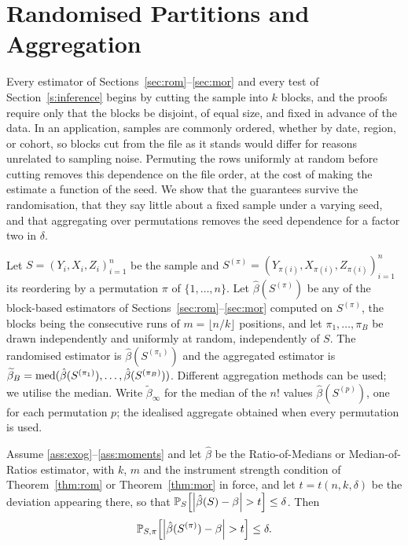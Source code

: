 \section{Randomised Partitions and Aggregation}
\label{sec:aggregation}

Every estimator of Sections~\ref{sec:rom}--\ref{sec:mor} and every test of Section~\ref{s:inference} begins by cutting the sample into $k$ blocks, and the proofs require only that the blocks be disjoint, of equal size, and fixed in advance of the data. In an application, samples are commonly ordered, whether by date, region, or cohort, so blocks cut from the file as it stands would differ for reasons unrelated to sampling noise. Permuting the rows uniformly at random before cutting removes this dependence on the file order, at the cost of making the estimate a function of the seed. We show that the guarantees survive the randomisation, that they say little about a fixed sample under a varying seed, and that aggregating over permutations removes the seed dependence for a factor two in $\delta$.

\begin{definition}
\label{def:randomised}
    Let $S = (Y_i,X_i,Z_i)_{i=1}^{n}$ be the sample and $S^{(\pi)} = (Y_{\pi(i)},X_{\pi(i)},Z_{\pi(i)})_{i=1}^{n}$ its reordering by a permutation $\pi$ of $\{1,\dots,n\}$. Let $\hat{\beta}(S^{(\pi)})$ be any of the block-based estimators of Sections~\ref{sec:rom}--\ref{sec:mor} computed on $S^{(\pi)}$, the blocks being the consecutive runs of $m = \lfloor n/k\rfloor$ positions, and let $\pi_1,\dots,\pi_B$ be drawn independently and uniformly at random, independently of $S$. The randomised estimator is $\hat{\beta}(S^{(\pi_1)})$ and the aggregated estimator is $\widetilde{\beta}_B = \operatorname{med}(\hat{\beta}(S^{(\pi_1)}),\dots,\hat{\beta}(S^{(\pi_B)}))$. Different aggregation methods can be used; we utilise the median. Write $\widetilde{\beta}_\infty$ for the median of the $n!$ values $\hat{\beta}(S^{(p)})$, one for each permutation $p$; the idealised aggregate obtained when every permutation is used.
\end{definition}

\begin{proposition}
\label{prop:transfer}
    Assume \ref{ass:exog}--\ref{ass:moments} and let $\hat{\beta}$ be the Ratio-of-Medians or Median-of-Ratios estimator, with $k$, $m$ and the instrument strength condition of Theorem~\ref{thm:rom} or Theorem~\ref{thm:mor} in force, and let $t = t(n,k,\delta)$ be the deviation appearing there, so that $\operatorname{\mathbb{P}}_S\!\left[\left|\hat{\beta}(S)-\beta\right| > t\right] \leq \delta$. Then
    \begin{equation}
    \label{eq:transfer}
        \operatorname{\mathbb{P}}_{S,\pi}\!\left[\left|\hat{\beta}(S^{(\pi)}) - \beta\right| > t\right] \leq \delta.
    \end{equation}
\end{proposition}


